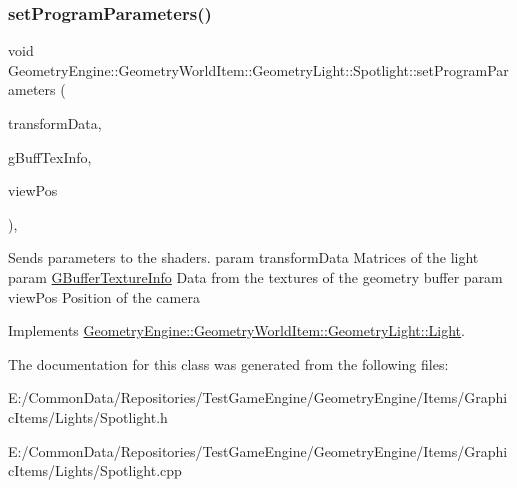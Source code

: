 \subsubsection{\texorpdfstring{setProgramParameters()}{setProgramParameters()}}
{\footnotesize\ttfamily void Geometry\+Engine\+::\+Geometry\+World\+Item\+::\+Geometry\+Light\+::\+Spotlight\+::set\+Program\+Parameters (\begin{DoxyParamCaption}\item[{const \mbox{\hyperlink{struct_geometry_engine_1_1_lighting_transformation_data}{Lighting\+Transformation\+Data}} \&}]{transform\+Data,  }\item[{const \mbox{\hyperlink{struct_geometry_engine_1_1_g_buffer_texture_info}{G\+Buffer\+Texture\+Info}} \&}]{g\+Buff\+Tex\+Info,  }\item[{const Q\+Vector3D \&}]{view\+Pos }\end{DoxyParamCaption})\hspace{0.3cm}{\ttfamily [protected]}, {\ttfamily [virtual]}}

Sends parameters to the shaders. param transform\+Data Matrices of the light param \mbox{\hyperlink{struct_geometry_engine_1_1_g_buffer_texture_info}{G\+Buffer\+Texture\+Info}} Data from the textures of the geometry buffer param view\+Pos Position of the camera 

Implements \mbox{\hyperlink{class_geometry_engine_1_1_geometry_world_item_1_1_geometry_light_1_1_light_a366be5945389fe58df4bf5aa8c43138f}{Geometry\+Engine\+::\+Geometry\+World\+Item\+::\+Geometry\+Light\+::\+Light}}.



The documentation for this class was generated from the following files\+:\begin{DoxyCompactItemize}
\item 
E\+:/\+Common\+Data/\+Repositories/\+Test\+Game\+Engine/\+Geometry\+Engine/\+Items/\+Graphic\+Items/\+Lights/Spotlight.\+h\item 
E\+:/\+Common\+Data/\+Repositories/\+Test\+Game\+Engine/\+Geometry\+Engine/\+Items/\+Graphic\+Items/\+Lights/Spotlight.\+cpp\end{DoxyCompactItemize}

